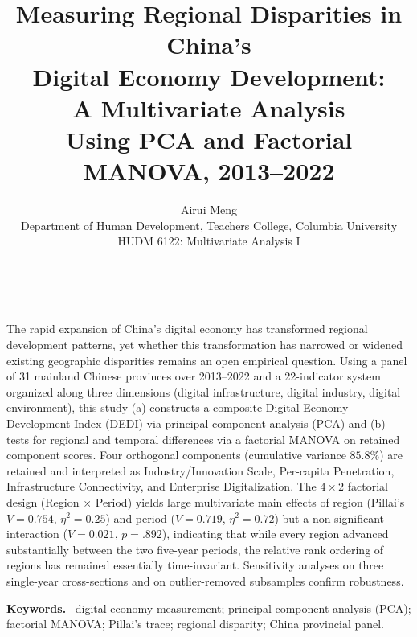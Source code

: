 \documentclass[12pt,letterpaper]{article}
\title{
    \vspace{4cm}
    \textbf{Measuring Regional Disparities in China's \\Digital Economy Development:\\
    A Multivariate Analysis \\ Using PCA and Factorial MANOVA, 2013--2022}
}
\author{
    Airui Meng\\[6pt]
    Department of Human Development, Teachers College, Columbia University\\
    HUDM 6122: Multivariate Analysis I
}
\date{}
\begin{document}
\vspace{4cm}
\maketitle
\thispagestyle{plain}

\newpage
\begin{center}
\begin{minipage}{0.92\textwidth}
 \,

\vspace{1cm}

The rapid expansion of China's digital economy has transformed regional development patterns, yet whether this transformation has narrowed or widened existing geographic disparities remains an open empirical question. Using a panel of 31 mainland Chinese provinces over 2013--2022 and a 22-indicator system organized along three dimensions (digital infrastructure, digital industry, digital environment), this study (a) constructs a composite Digital Economy Development Index (DEDI) via principal component analysis (PCA) and (b) tests for regional and temporal differences via a factorial MANOVA on retained component scores. Four orthogonal components (cumulative variance $85.8\%$) are retained
and interpreted as {Industry/Innovation Scale}, {Per-capita Penetration},
{Infrastructure Connectivity}, and {Enterprise Digitalization}. The
$4 \times 2$ factorial design (Region $\times$ Period) yields large multivariate main
effects of region (Pillai's $V=0.754$, $\eta^{2}=0.25$) and period
($V=0.719$, $\eta^{2}=0.72$) but a non-significant interaction
($V=0.021$, $p=.892$), indicating that while every region advanced substantially
between the two five-year periods, the relative rank ordering of regions has remained
essentially time-invariant. Sensitivity analyses on three single-year cross-sections
and on outlier-removed subsamples confirm robustness.

\vspace{0.5em}
\noindent\textbf{Keywords.} \, digital economy measurement; principal component analysis (PCA);
factorial MANOVA; Pillai's trace; regional disparity; China provincial panel.
\end{minipage}
\end{center}

\vspace{1em}
\newpage
\end{document}

